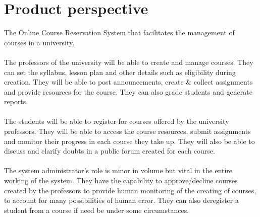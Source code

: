 \documentclass[12pt, a4]{report}
\begin{document}
\section{Product perspective}
The Online Course Reservation System that facilitates the management of courses in a university.
\\\\
The professors of the university will be able to create and manage courses. They can set the syllabus, lesson plan and other details such as eligibility during creation. They will be able to post announcements, create \& collect assignments and provide resources for the course. They can also grade students and generate reports.
\\\\
The students will be able to register for courses offered by the university professors. They will be able to access the course resources, submit assignments and monitor their progress in each course they take up. They will also be able to discuss and clarify doubts in a public forum created for each course.
\\\\
The system administrator's role is minor in volume but vital in the entire working of the system. They have the capability to approve/decline courses created by the professors to provide human monitoring of the creating of courses, to account for many possibilities of human error. They can also deregister a student from a course if need be under some circumstances.


\newpage
\end{document}
